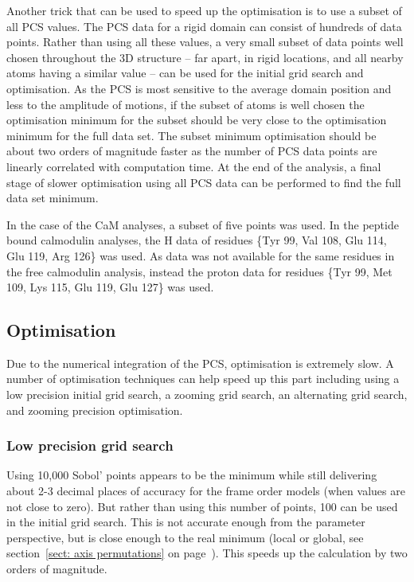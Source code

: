 Another trick that can be used to speed up the optimisation is to use a subset of all PCS values.
The PCS data for a rigid domain can consist of hundreds of data points.
Rather than using all these values, a very small subset of data points well chosen throughout the 3D structure -- far apart, in rigid locations, and all nearby atoms having a similar value -- can be used for the initial grid search and optimisation.
As the PCS is most sensitive to the average domain position and less to the amplitude of motions, if the subset of atoms is well chosen the optimisation minimum for the subset should be very close to the optimisation minimum for the full data set.
The subset minimum optimisation should be about two orders of magnitude faster as the number of PCS data points are linearly correlated with computation time.
At the end of the analysis, a final stage of slower optimisation using all PCS data can be performed to find the full data set minimum.

In the case of the CaM analyses, a subset of five points was used.
In the peptide bound calmodulin analyses, the H data of residues \{Tyr 99, Val 108, Glu 114, Glu 119, Arg 126\} was used.
As data was not available for the same residues in the free calmodulin analysis, instead the proton data for residues \{Tyr 99, Met 109, Lys 115, Glu 119, Glu 127\} was used.





\subsection{Optimisation}

Due to the numerical integration of the PCS, optimisation is extremely slow.
A number of optimisation techniques can help speed up this part including using a low precision initial grid search, a zooming grid search, an alternating grid search, and zooming precision optimisation.






\subsubsection{Low precision grid search}

Using 10,000 Sobol' points appears to be the minimum while still delivering about 2-3 decimal places of accuracy for the frame order models (when values are not close to zero).
But rather than using this number of points, 100 can be used in the initial grid search.
This is not accurate enough from the parameter perspective, but is close enough to the real minimum (local or global, see section~\ref{sect: axis permutations} on page~\pageref{sect: axis permutations}).
This speeds up the calculation by two orders of magnitude.




